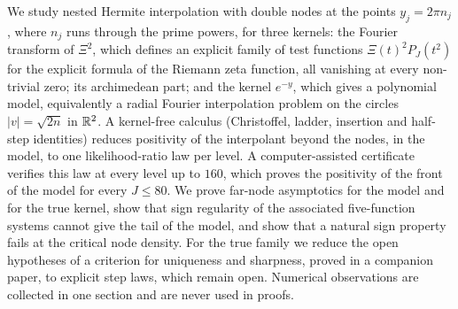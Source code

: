 We study nested Hermite interpolation with double nodes at the points $y_j=2\pi n_j$, where $n_j$ runs through the
prime powers, for three kernels: the Fourier transform of $\Xi^2$, which defines an explicit family of test functions
$\Xi(t)^2P_J(t^2)$ for the explicit formula of the Riemann zeta function, all vanishing at every non-trivial zero; its archimedean part; and the
kernel $e^{-y}$, which gives a polynomial model, equivalently a radial Fourier interpolation problem on the circles
$\lvert v\rvert=\sqrt{2n}$ in $\mathbb R^2$. A kernel-free calculus (Christoffel, ladder, insertion and half-step identities)
reduces positivity of the interpolant beyond the nodes, in the model, to one likelihood-ratio law per level. A
computer-assisted certificate verifies this law at every level up to $160$, which proves the positivity of the front of
the model for every $J\le80$. We prove far-node asymptotics for the model and for the true kernel, show that sign
regularity of the associated five-function systems cannot give the tail of the model, and show that a natural sign
property fails at the critical node density. For the true family we reduce the open hypotheses of a criterion for
uniqueness and sharpness, proved in a companion paper, to explicit step laws, which remain open. Numerical observations
are collected in one section and are never used in proofs.
